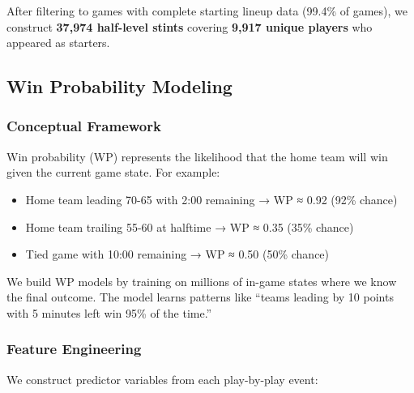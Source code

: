 \documentclass[
  letterpaper,
  DIV=11,
  numbers=noendperiod]{scrartcl}
\providecommand{\tightlist}{%
  \setlength{\itemsep}{0pt}\setlength{\parskip}{0pt}}
\begin{document}
After filtering to games with complete starting lineup data (99.4\% of
games), we construct \textbf{37,974 half-level stints} covering
\textbf{9,917 unique players} who appeared as starters.

\subsection{Win Probability Modeling}\label{win-probability-modeling}

\subsubsection{Conceptual Framework}\label{conceptual-framework}

Win probability (WP) represents the likelihood that the home team will
win given the current game state. For example:

\begin{itemize}
\tightlist
\item
  Home team leading 70-65 with 2:00 remaining → WP ≈ 0.92 (92\% chance)
\item
  Home team trailing 55-60 at halftime → WP ≈ 0.35 (35\% chance)
\item
  Tied game with 10:00 remaining → WP ≈ 0.50 (50\% chance)
\end{itemize}

We build WP models by training on millions of in-game states where we
know the final outcome. The model learns patterns like ``teams leading
by 10 points with 5 minutes left win 95\% of the time.''

\subsubsection{Feature Engineering}\label{feature-engineering}

We construct predictor variables from each play-by-play event:
\end{document}
